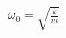 \documentclass[preview]{standalone}
\begin{document}
\begin{align*}
\omega_0 = \sqrt{\frac{k}{m}}
\end{align*}
\end{document}
